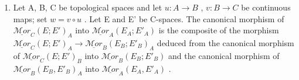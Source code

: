 \begin{enumerate}
\def\labelenumi{\arabic{enumi})}
\setcounter{enumi}{1}
\tightlist
\item
  Let A, B, C be topological spaces and let \(u\colon A\to B\) , \(v\colon B\to C\) be continuous maps; set \(w=v\circ u\) . Let E and E' be C-spaces. The canonical morphism of \(\underline{\mathcal{M}or}_{C}(E;E')_{A}\) into \(\underline{\mathcal{M}or}_{A}(E_{A};E'_{A})\) is the composite of the morphism \(\underline{\mathcal{M}or}_{C}(E;E')_{A}\to\underline{\mathcal{M}or}_{B}(E_{B};E'_{B})_{A}\) deduced from the canonical morphism of \(\underline{\mathcal{M}or}_{C}(E;E')_{B}\) into \(\underline{\mathcal{M}or}_{B}(E_{B};E'_{B})\) and the canonical morphism of \(\underline{\mathcal{M}or}_{B}(E_{B},E'_{B})_{A}\) into \(\underline{\mathcal{M}or}_{A}(E_{A},E'_{A})\) .
\end{enumerate}
